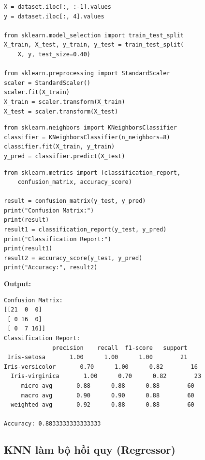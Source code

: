 \begin{vidu}[title={Tiền xử lý và chia tập}]
\begin{lstlisting}
X = dataset.iloc[:, :-1].values
y = dataset.iloc[:, 4].values

from sklearn.model_selection import train_test_split
X_train, X_test, y_train, y_test = train_test_split(
    X, y, test_size=0.40)

from sklearn.preprocessing import StandardScaler
scaler = StandardScaler()
scaler.fit(X_train)
X_train = scaler.transform(X_train)
X_test = scaler.transform(X_test)
\end{lstlisting}
\end{vidu}

\begin{vidu}[title={Huấn luyện và dự đoán}]
\begin{lstlisting}
from sklearn.neighbors import KNeighborsClassifier
classifier = KNeighborsClassifier(n_neighbors=8)
classifier.fit(X_train, y_train)
y_pred = classifier.predict(X_test)
\end{lstlisting}
\end{vidu}

\begin{vidu}[title={Báo cáo kết quả}]
\begin{lstlisting}
from sklearn.metrics import (classification_report,
    confusion_matrix, accuracy_score)

result = confusion_matrix(y_test, y_pred)
print("Confusion Matrix:")
print(result)
result1 = classification_report(y_test, y_pred)
print("Classification Report:")
print(result1)
result2 = accuracy_score(y_test, y_pred)
print("Accuracy:", result2)
\end{lstlisting}

\textbf{Output:}
\begin{verbatim}
Confusion Matrix:
[[21  0  0]
 [ 0 16  0]
 [ 0  7 16]]
Classification Report:
              precision    recall  f1-score   support
 Iris-setosa       1.00      1.00      1.00        21
Iris-versicolor       0.70      1.00      0.82        16
  Iris-virginica       1.00      0.70      0.82        23
     micro avg       0.88      0.88      0.88        60
     macro avg       0.90      0.90      0.88        60
  weighted avg       0.92      0.88      0.88        60

Accuracy: 0.8833333333333333
\end{verbatim}
\end{vidu}

\subsection{KNN làm bộ hồi quy (Regressor)}

